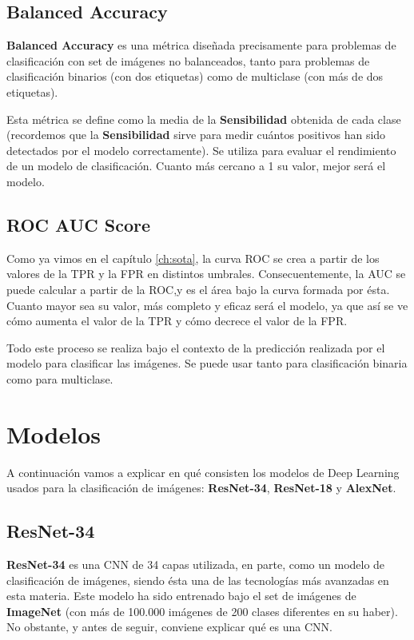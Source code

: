 \subsection{Balanced Accuracy}

\textbf{Balanced Accuracy} es una métrica diseñada precisamente para problemas de clasificación con set de imágenes no balanceados, tanto para problemas de clasificación binarios (con dos etiquetas) como de multiclase (con más de dos etiquetas).

Esta métrica se define como la media de la \textbf{Sensibilidad} obtenida de cada clase (recordemos que la \textbf{Sensibilidad} sirve para medir cuántos positivos han sido detectados por el modelo correctamente). Se utiliza para evaluar el rendimiento de un modelo de clasificación. Cuanto más cercano a 1 su valor, mejor será el modelo. %

\subsection{ROC AUC Score}

Como ya vimos en el capítulo \ref{ch:sota}, la curva \ac{ROC} se crea a partir de los valores de la \ac{TPR} y la \ac{FPR} en distintos umbrales. Consecuentemente, la \ac{AUC} se puede calcular a partir de la \ac{ROC},y es el área bajo la curva formada por ésta. Cuanto mayor sea su valor, más completo y eficaz será el modelo, ya que así se ve cómo aumenta el valor de la \ac{TPR} y cómo decrece el valor de la \ac{FPR}.

Todo este proceso se realiza bajo el contexto de la predicción realizada por el modelo para clasificar las imágenes. Se puede usar tanto para clasificación binaria como para multiclase. %

\section{Modelos}

A continuación vamos a explicar en qué consisten los modelos de Deep Learning usados para la clasificación de imágenes: \textbf{ResNet-34}, \textbf{ResNet-18} y \textbf{AlexNet}.

\subsection{ResNet-34}

\textbf{ResNet-34} es una \ac{CNN} de 34 capas utilizada, en parte, como un modelo de clasificación de imágenes, siendo ésta una de las tecnologías más avanzadas en esta materia. Este modelo ha sido entrenado bajo el set de imágenes de \textbf{ImageNet} (con más de 100.000 imágenes de 200 clases diferentes en su haber). No obstante, y antes de seguir, conviene explicar qué es una \ac{CNN}. %

